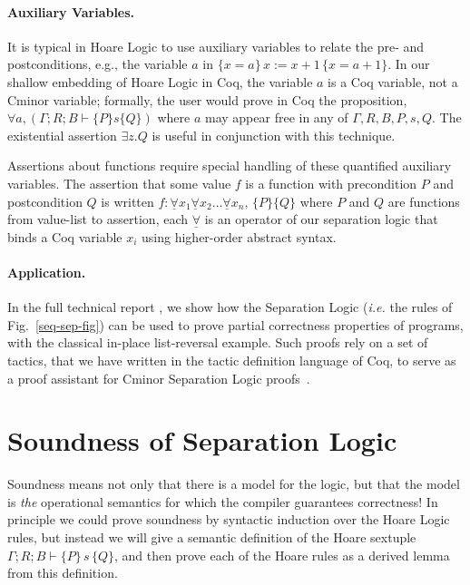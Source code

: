 \documentclass{llncs}
\newcommand{\cminor}{Cminor}
\newcommand{\semax}[6]{#1;#2;#3\vdash \{#4\}#5\{#6\}}
\begin{document}
\paragraph{Auxiliary Variables.}  It is typical in Hoare Logic to use auxiliary variables to relate the pre- and postconditions, e.g., the variable $a$ in
$\{x=a\}\,x:=x+1\,\{x=a+1\}$.  In our shallow embedding of Hoare Logic
in Coq, the variable $a$ is a Coq variable, not a \cminor{} variable;
formally, the user would prove in Coq the proposition, $\forall
a,(\semax{\Gamma}{R}{B}{P}{s}{Q})$ where $a$ may appear free in any of
$\Gamma,R,B,P,s,Q$.  The existential assertion $\exists z.Q$ is useful
in conjunction with this technique.

Assertions about functions require special handling of these 
quantified auxiliary variables.  The assertion that some value $f$ is a 
function with precondition $P$ and postcondition $Q$ is written
$f: \underline{\forall} x_1\underline{\forall} x_2\ldots\underline{\forall} x_n,\,\{P\}\{Q\}$
where $P$ and $Q$ are functions from value-list to assertion, each
$\underline{\forall}$ is an operator of our separation logic that
binds a Coq variable $x_i$ using higher-order abstract syntax.


\paragraph{Application.}
In the full technical report \cite{appel07:tr}, 
we show how the Separation Logic (\textit{i.e.} the rules of Fig.~\ref{seq-sep-fig}) 
can be used to prove partial correctness properties of programs,
with the classical in-place list-reversal example.
Such proofs rely on a set of tactics, that we have written in the tactic definition language of Coq, 
to serve as a proof assistant for \cminor{} Separation Logic proofs~\cite{appel06:septacs}.



\section{Soundness of Separation Logic}\label{sec:soundness}

Soundness means not only that there is a model for the
logic, but that the model is \emph{the} operational semantics 
for which the compiler guarantees correctness!
In principle we could prove soundness by syntactic induction over the 
Hoare Logic rules, but instead we will give a semantic definition
of the Hoare sextuple $\semax{\Gamma}{R}{B}{P}{\,s\,}{Q}$,
and then prove each of the Hoare rules as a derived lemma from 
this definition.
\end{document}
